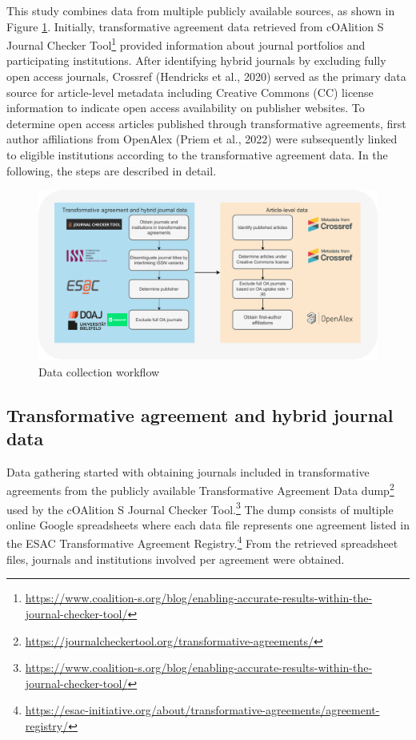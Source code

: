 \documentclass[a4paper,man,floatsintext,longtable,noextraspace,12pt]{apa6}
\begin{document}
This study combines data from multiple publicly available sources, as
shown in Figure \ref{fig:data_workflow}. Initially, transformative
agreement data retrieved from cOAlition S Journal Checker
Tool\footnote{\url{https://www.coalition-s.org/blog/enabling-accurate-results-within-the-journal-checker-tool/}}
provided information about journal portfolios and participating
institutions. After identifying hybrid journals by excluding fully open
access journals, Crossref (Hendricks et al., 2020) served as the primary
data source for article-level metadata including Creative Commons (CC)
license information to indicate open access availability on publisher
websites. To determine open access articles published through
transformative agreements, first author affiliations from OpenAlex
(Priem et al., 2022) were subsequently linked to eligible institutions
according to the transformative agreement data. In the following, the
steps are described in detail.

\begin{figure}[ht!]

{\centering \includegraphics[width=0.99\linewidth,]{data_collection_workflow} 

}

\caption{Data collection workflow}\label{fig:data_workflow}
\end{figure}

\hypertarget{transformative-agreement-and-hybrid-journal-data}{%
\subsection{Transformative agreement and hybrid journal
data}\label{transformative-agreement-and-hybrid-journal-data}}

Data gathering started with obtaining journals included in
transformative agreements from the publicly available Transformative
Agreement Data dump\footnote{\url{https://journalcheckertool.org/transformative-agreements/}}
used by the cOAlition S Journal Checker Tool.\footnote{\url{https://www.coalition-s.org/blog/enabling-accurate-results-within-the-journal-checker-tool/}}
The dump consists of multiple online Google spreadsheets where each data
file represents one agreement listed in the ESAC Transformative
Agreement Registry.\footnote{\url{https://esac-initiative.org/about/transformative-agreements/agreement-registry/}}
From the retrieved spreadsheet files, journals and institutions involved
per agreement were obtained.
\end{document}
